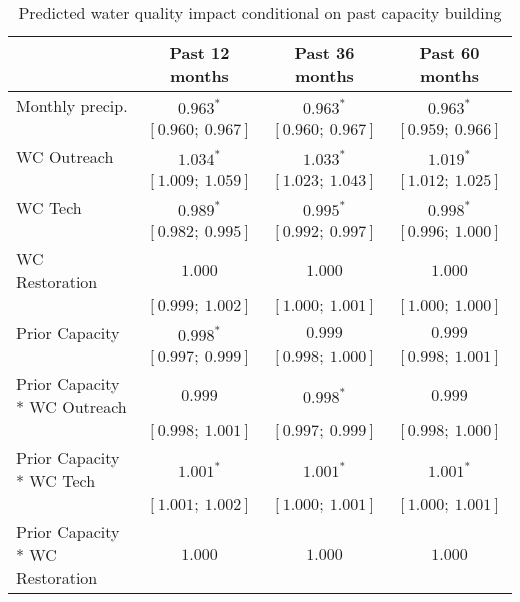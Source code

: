 
\begin{table}
\caption{Predicted water quality impact conditional on past capacity building}
\begin{center}
\begin{tabular}{l c c c }
\hline
                                               & Past 12 months & Past 36 months & Past 60 months \\
\hline
Monthly precip.                                & $0.963^{*}$       & $0.963^{*}$       & $0.963^{*}$       \\
                                               & $[0.960;\ 0.967]$ & $[0.960;\ 0.967]$ & $[0.959;\ 0.966]$ \\
WC Outreach                                    & $1.034^{*}$       & $1.033^{*}$       & $1.019^{*}$       \\
                                               & $[1.009;\ 1.059]$ & $[1.023;\ 1.043]$ & $[1.012;\ 1.025]$ \\
WC Tech                                        & $0.989^{*}$       & $0.995^{*}$       & $0.998^{*}$       \\
                                               & $[0.982;\ 0.995]$ & $[0.992;\ 0.997]$ & $[0.996;\ 1.000]$ \\
WC Restoration                                 & $1.000$           & $1.000$           & $1.000$           \\
                                               & $[0.999;\ 1.002]$ & $[1.000;\ 1.001]$ & $[1.000;\ 1.000]$ \\
Prior Capacity                                 & $0.998^{*}$       & $0.999$           & $0.999$           \\
                                               & $[0.997;\ 0.999]$ & $[0.998;\ 1.000]$ & $[0.998;\ 1.001]$ \\
Prior Capacity * WC Outreach                   & $0.999$           & $0.998^{*}$       & $0.999$           \\
                                               & $[0.998;\ 1.001]$ & $[0.997;\ 0.999]$ & $[0.998;\ 1.000]$ \\
Prior Capacity * WC Tech                       & $1.001^{*}$       & $1.001^{*}$       & $1.001^{*}$       \\
                                               & $[1.001;\ 1.002]$ & $[1.000;\ 1.001]$ & $[1.000;\ 1.001]$ \\
Prior Capacity * WC Restoration                & $1.000$           & $1.000$           & $1.000$           \\

\end{tabular}
\end{center}
\end{table}
